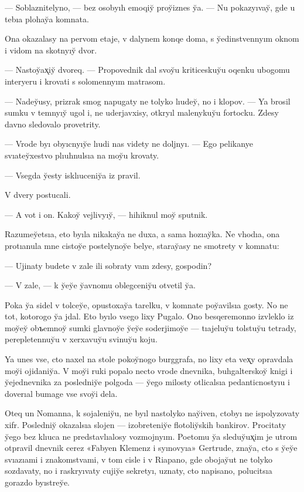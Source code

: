 \documentclass[10pt]{book}
\begin{document}
— Soblaznitelyno, — bez osobyıh emoqiy̆ proy̆iznes y̆a. — Nu pokazyıvay̆, gde u tebıa plohay̆a komnata.

Ona okazalasy na pervom etaje, v dalynem konqe doma, s y̆edinstvennyım oknom i vidom na skotnyıy̆ dvor.

— Nastoy̆ax̨iy̆ dvoreq. — Propovednik dal svoy̆u kriticeskuy̆u oqenku ubogomu interyeru i krovati s solomennyım matrasom.

— Nadey̆usy, prizrak smog napugaty ne tolyko lıudey̆, no i klopov. — Ya brosil sumku v temnyıy̆ ugol i, ne uderjavxisy, otkryıl malenykuy̆u fortocku. Zdesy davno sledovalo provetrity.

— Vrode byı obyıcnyıy̆e lıudi nas videty ne doljnyı. — Ego pelikanye svıatey̆xestvo plıuhnulsıa na moy̆u krovaty.

— Vsegda y̆esty isklıuceniy̆a iz pravil.

V dvery postucali.

— A vot i on. Kakoy̆ vejlivyıy̆, — hihiknul moy̆ sputnik.

Razumey̆etsıa, eto byıla nikakay̆a ne duxa, a sama hozıay̆ka. Ne vhodıa, ona protıanula mne cistoy̆e postelynoy̆e belye, staray̆asy ne smotrety v komnatu:

— Ujinaty budete v zale ili sobraty vam zdesy, gospodin?

— V zale, — k y̆ey̆e y̆avnomu oblegceniy̆u otvetil y̆a.

Poka y̆a sidel v tolcey̆e, opustoxay̆a tarelku, v komnate poy̆avilsıa gosty. No ne tot, kotorogo y̆a jdal. Eto byılo vsego lixy Pugalo. Ono besqeremonno izvleklo iz moy̆ey̆ obъemnoy̆ sumki glavnoy̆e y̆ey̆e soderjimoy̆e — tıajeluy̆u tolstuy̆u tetrady, perepletennuy̆u v xerxavuy̆u svinuy̆u koju.

Ya unes vse, cto naxel na stole pokoy̆nogo burggrafa, no lixy eta vex̨y opravdala moy̆i ojidaniy̆a. V moy̆i ruki popalo necto vrode dnevnika, buhgalterskoy̆ knigi i y̆ejednevnika za posledniy̆e polgoda — y̆ego milosty otlicalsıa pedanticnostyıu i doverıal bumage vse svoy̆i dela.

Oteq un Nomanna, k sojaleniy̆u, ne byıl nastolyko nay̆iven, ctobyı ne ispolyzovaty xifr. Posledniy̆ okazalsıa slojen — izobreteniy̆e flotoliy̆skih bankirov. Procitaty y̆ego bez klıuca ne predstavlıalosy vozmojnyım. Poetomu y̆a sleduy̆ux̨im je utrom otpravil dnevnik cerez «Fabyen Klemenz i syınovyıa» Gertrude, znay̆a, cto s y̆ey̆e svıazıami i znakomstvami, v tom cisle i v Riapano, gde obojay̆ut ne tolyko sozdavaty, no i raskryıvaty cujiy̆e sekretyı, uznaty, cto napisano, polucitsıa gorazdo byıstrey̆e.
\end{document}
